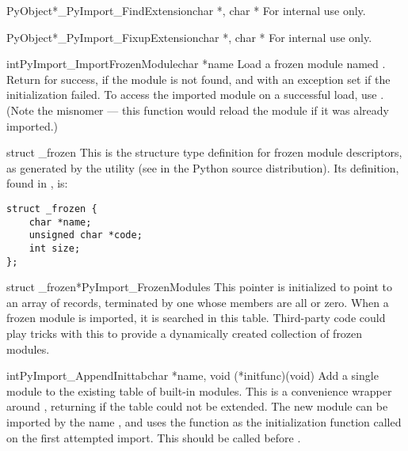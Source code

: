\documentclass{manual}
\begin{document}
\begin{cfuncdesc}{PyObject*}{_PyImport_FindExtension}{char *, char *}
For internal use only.
\end{cfuncdesc}

\begin{cfuncdesc}{PyObject*}{_PyImport_FixupExtension}{char *, char *}
For internal use only.
\end{cfuncdesc}

\begin{cfuncdesc}{int}{PyImport_ImportFrozenModule}{char *name}
Load a frozen module named .  Return  for success,
 if the module is not found, and  with an exception
set if the initialization failed.  To access the imported module on a
successful load, use .
(Note the misnomer --- this function would reload the module if it was
already imported.)
\end{cfuncdesc}

\begin{ctypedesc}[_frozen]{struct _frozen}
This is the structure type definition for frozen module descriptors,
as generated by the  utility
(see  in the Python source distribution).  Its
definition, found in , is:

\begin{verbatim}
struct _frozen {
    char *name;
    unsigned char *code;
    int size;
};
\end{verbatim}
\end{ctypedesc}

\begin{cvardesc}{struct _frozen*}{PyImport_FrozenModules}
This pointer is initialized to point to an array of  records, terminated by one whose members are all
\NULL{} or zero.  When a frozen module is imported, it is searched in
this table.  Third-party code could play tricks with this to provide a 
dynamically created collection of frozen modules.
\end{cvardesc}

\begin{cfuncdesc}{int}{PyImport_AppendInittab}{char *name,
                                               void (*initfunc)(void)}
Add a single module to the existing table of built-in modules.  This
is a convenience wrapper around ,
returning  if the table could not be extended.  The new
module can be imported by the name , and uses the function
 as the initialization function called on the first
attempted import.  This should be called before
.
\end{cfuncdesc}
\end{document}
